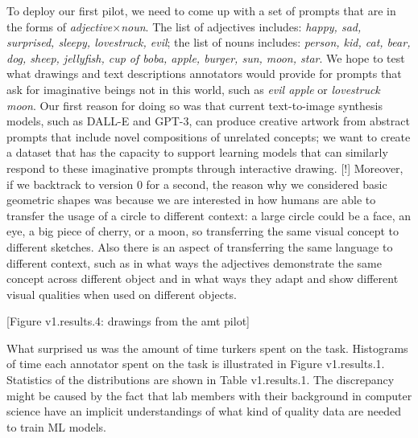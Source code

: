 To deploy our first pilot, we need to come up with a set of prompts that are in the forms of \textit{adjective}$\times$\textit{noun}. The list of adjectives includes: 
\textit{happy, sad, surprised, sleepy, lovestruck, evil};
the list of nouns includes: 
\textit{person, kid, cat, bear, dog, sheep, jellyfish, cup of boba, apple, burger, sun, moon, star}.
We hope to test what drawings and text descriptions annotators would provide for prompts that ask for imaginative beings not in this world, such as \textit{evil apple} or \textit{lovestruck moon}. Our first reason for doing so was that current text-to-image synthesis models, such as DALL-E and GPT-3, can produce creative artwork from abstract prompts that include novel compositions of unrelated concepts; we want to create a dataset that has the capacity to support learning models that can similarly respond to these imaginative prompts through interactive drawing. 
[!] Moreover, if we backtrack to version 0 for a second, the reason why we considered basic geometric shapes was because we are interested in how humans are able to transfer the usage of a circle to different context: a large circle could be a face, an eye, a big piece of cherry, or a moon, so transferring the same visual concept to different sketches. Also there is an aspect of transferring the same language to different context, such as in what ways the adjectives demonstrate the same concept across different object and in what ways they adapt and show different visual qualities when used on different objects.   

[Figure v1.results.4: drawings from the amt pilot]

What surprised us was the amount of time turkers spent on the task. Histograms of time each annotator spent on the task is illustrated in Figure v1.results.1. Statistics of the distributions are shown in Table v1.results.1. The discrepancy might be caused by the fact that lab members with their background in computer science have an implicit understandings of what kind of quality data are needed to train ML models.   

